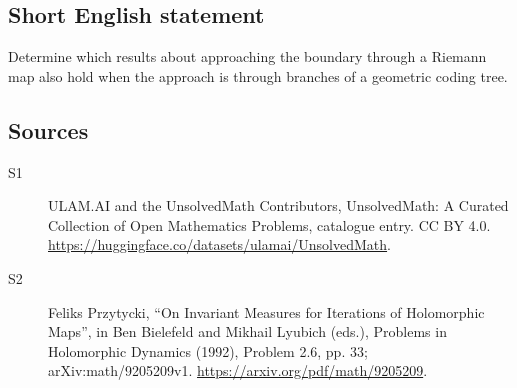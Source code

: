 \documentclass[11pt]{article}
\begin{document}
\subsection{Short English statement}
Determine which results about approaching the boundary through a Riemann map also hold when the approach is through branches of a geometric coding tree.
\subsection{Sources}
\begin{description}
\item[\hypertarget{source:statement:1}{S1}] ULAM.AI and the UnsolvedMath Contributors, UnsolvedMath: A Curated Collection of Open Mathematics Problems, catalogue entry. CC BY 4.0. \url{https://huggingface.co/datasets/ulamai/UnsolvedMath}.
\item[\hypertarget{source:statement:2}{S2}] Feliks Przytycki, ``On Invariant Measures for Iterations of Holomorphic Maps'', in Ben Bielefeld and Mikhail Lyubich (eds.), Problems in Holomorphic Dynamics (1992), Problem 2.6, pp. 33; arXiv:math/9205209v1. \url{https://arxiv.org/pdf/math/9205209}.
\end{description}
\label{end:statement}
\end{document}
